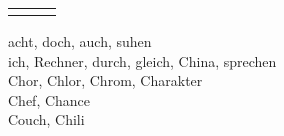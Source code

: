 \documentclass[12pt]{article}
\begin{document}
\begin{multicols}{2}
\begin{tabular}{lll}
		\hline                                                          \\
	\end{tabular}
	acht, doch, auch, suhen                       \\
	ich, Rechner, durch, gleich, China, sprechen  \\
	Chor, Chlor, Chrom, Charakter                 \\
	Chef, Chance                                  \\
	Couch, Chili
\end{multicols}

\pagebreak


\section*{}
\end{document}
